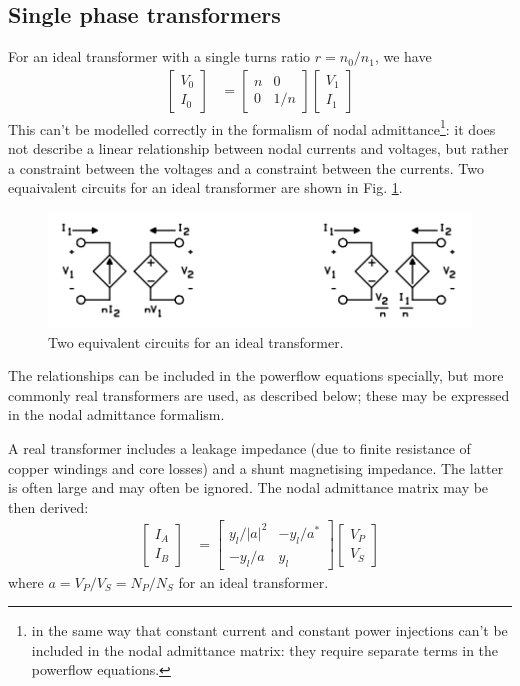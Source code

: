 \documentclass[11pt]{article}
\begin{document}
\subsection{Single phase transformers}
For an ideal transformer with a single turns ratio $r = n_0/n_1$, we have
\begin{align}
\begin{bmatrix}V_0 \\ I_0\end{bmatrix} &= \begin{bmatrix}n & 0 \\ 0 & 1/n\end{bmatrix}\begin{bmatrix}V_1 \\ I_1 \end{bmatrix}
\end{align}
This can't be modelled correctly in the formalism of nodal admittance\footnote{in the same way that constant current and constant power injections can't be included in the nodal admittance matrix: they require separate terms in the powerflow equations.}: it does not describe a linear relationship between nodal currents and voltages, but rather a constraint between the voltages and a constraint between the currents. Two equaivalent circuits for an ideal transformer are shown in Fig. \ref{FIG_IDEAL_TRANS_EQUIV}.
\begin{figure}[!h]
	\begin{center}
		\includegraphics[width=(\textwidth-2cm)]{ideal_transformer_equiv.png}
	\end{center}
	\caption{
		Two equivalent circuits for an ideal transformer.
	}
	\label{FIG_IDEAL_TRANS_EQUIV}
\end{figure}
The relationships can be included in the powerflow equations specially, but more commonly real transformers are used, as described below; these may be expressed in the nodal admittance formalism.

A real transformer includes a leakage impedance (due to finite resistance of copper windings and core losses) and a shunt magnetising impedance. The latter is often large and may often be ignored. The nodal admittance matrix may be then derived:
\begin{align}
\begin{bmatrix}I_A \\ I_B \end{bmatrix} &= 
\begin{bmatrix}y_l/|a|^2 & -y_l/a^* \\ -y_l/a & y_l\end{bmatrix}
\begin{bmatrix}V_P \\ V_S \end{bmatrix}
\end{align}
where $a = V_P / V_S = N_P / N_S$ for an ideal transformer.
\end{document}
